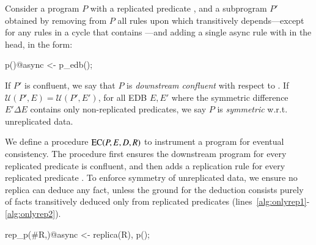 \begin{definition}
Consider a \lang program $P$ with a replicated predicate , and a subprogram
$P'$ obtained by removing from $P$ all rules upon which  transitively
depends---except for any rules in a cycle that contains ---and adding a single async rule with  in the head, in the form:

\begin{Dedalus}
p()@async <- p_edb();
\end{Dedalus}
If $P'$ is confluent, we say that $P$ is {\em downstream confluent} with respect to .  
If $\mathcal{U}(P', E) = \mathcal{U}(P', E')$, for all EDB $E, E'$ where the symmetric difference $E' \Delta E$ contains only non-replicated predicates, we say $P$ is {\em symmetric} w.r.t. unreplicated data.
\end{definition}


We define a procedure $\textsc{EC}(P, E, D, R)$ to instrument a program for eventual consistency.  The procedure first ensures the downstream program for every replicated predicate is confluent, and then adds a replication rule for every replicated predicate .  To enforce symmetry of unreplicated data, we ensure no replica can deduce any fact, unless the ground for the deduction consists purely of facts transitively deduced only from replicated predicates (lines~\ref{alg:onlyrep1}-\ref{alg:onlyrep2}).

\begin{Dedalus}
rep_p(#R,)@async <- replica(R), p();
\end{Dedalus}



